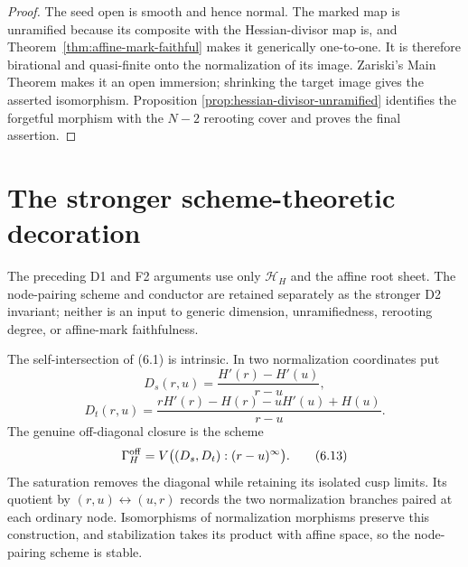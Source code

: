 \begin{proof}
The seed open is smooth and hence normal.  The marked map is unramified
because its composite with the Hessian-divisor map is, and
Theorem~\ref{thm:affine-mark-faithful} makes it generically one-to-one.
It is therefore birational and quasi-finite onto the normalization of its
image.  Zariski's Main Theorem makes it an open immersion; shrinking the
target image gives the asserted isomorphism.  Proposition
\ref{prop:hessian-divisor-unramified} identifies the forgetful morphism with the
$N-2$ rerooting cover and proves the final assertion.
\end{proof}

\section{The stronger scheme-theoretic decoration}

The preceding D1 and F2 arguments use only $\mathcal H_H$ and the affine
root sheet.  The node-pairing scheme and conductor are retained separately
as the stronger D2 invariant; neither is an input to generic dimension,
unramifiedness, rerooting degree, or affine-mark faithfulness.

The self-intersection of (6.1) is intrinsic.  In two normalization
coordinates put
\[
 D_s(r,u)=\frac{H'(r)-H'(u)}{r-u},
\]
\[
 D_t(r,u)=
 \frac{rH'(r)-H(r)-uH'(u)+H(u)}{r-u}.
\]
The genuine off-diagonal closure is the scheme
\[
 \Gamma_H^{\rm off}
 =V\bigl((D_s,D_t):(r-u)^\infty\bigr).                 \tag{6.13}
\]
The saturation removes the diagonal while retaining its isolated cusp
limits.  Its quotient by $(r,u)\leftrightarrow(u,r)$ records the two
normalization branches paired at each ordinary node.  Isomorphisms of
normalization morphisms preserve this construction, and stabilization takes
its product with affine space, so the node-pairing scheme is stable.

